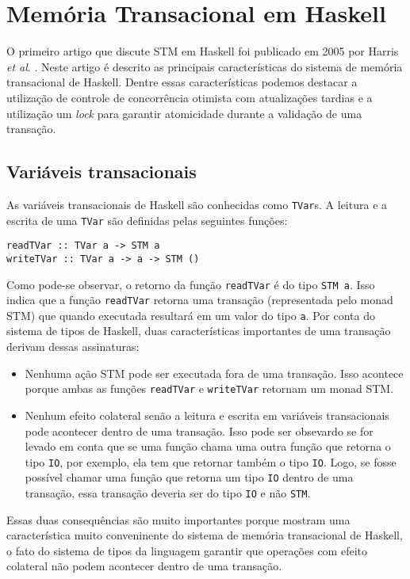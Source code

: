 \section{Memória Transacional em Haskell}

O primeiro artigo que discute STM em Haskell foi publicado em 2005 por Harris \emph{et al}. \cite{harris2005composable}. Neste artigo é descrito as principais características do sistema de memória transacional de Haskell. Dentre essas características podemos destacar a utilização de controle de concorrência otimista com atualizações tardias e a utilização um \emph{lock} para garantir atomicidade durante a validação de uma transação.

\subsection{Variáveis transacionais}

As variáveis transacionais de Haskell são conhecidas como \verb|TVar|s. A leitura e a escrita de uma \verb|TVar| são definidas pelas seguintes funções:
\begin{verbatim}
readTVar :: TVar a -> STM a
writeTVar :: TVar a -> a -> STM ()
\end{verbatim}

Como pode-se observar, o retorno da função \verb|readTVar| é do tipo \verb|STM a|. Isso indica que a função \verb|readTVar| retorna uma transação (representada pelo monad STM) que quando executada resultará em um valor do tipo \verb|a|. Por conta do sistema de tipos de Haskell, duas características importantes de uma transação derivam dessas assinaturas:
\begin{itemize}
  \item Nenhuma ação STM pode ser executada fora de uma transação. Isso acontece porque ambas as funções \verb|readTVar| e \verb|writeTVar| retornam um monad STM.
  \item Nenhum efeito colateral senão a leitura e escrita em variáveis transacionais pode acontecer dentro de uma transação. Isso pode ser obsevardo se for levado em conta que se uma função chama uma outra função que retorna o tipo \verb|IO|, por exemplo, ela tem que retornar também o tipo \verb|IO|. Logo, se fosse possível chamar uma função que retorna um tipo \verb|IO| dentro de uma transação, essa transação deveria ser do tipo \verb|IO| e não \verb|STM|.
\end{itemize}

Essas duas consequências são muito importantes porque mostram uma característica muito conveninente do sistema de memória transacional de Haskell, o fato do sistema de tipos da linguagem garantir que operações com efeito colateral não podem acontecer dentro de uma transação.


